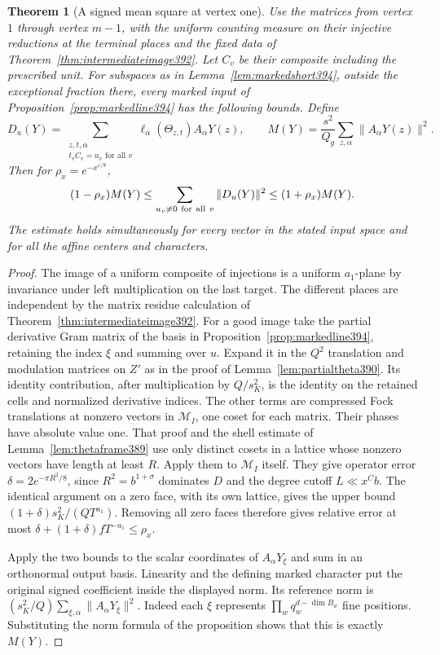 \documentclass[a4paper,11pt]{article}
\newtheorem{theorem}[proposition]{Theorem}
\theoremstyle{definition}
\theoremstyle{remark}
\numberwithin{equation}{section}
\begin{document}
\begin{theorem}[A signed mean square at vertex one]
\label{thm:firstvertex394}
Use the matrices from vertex \(1\) through vertex \(m-1\),
with the uniform counting measure on their injective reductions
at the terminal places and the fixed data of
Theorem~\ref{thm:intermediateimage392}. Let \(C_v\) be their
composite including the prescribed unit. For subspaces as in
Lemma~\ref{lem:markedshort394}, outside the exceptional fraction
there, every marked input of Proposition~\ref{prop:markedline394}
has the following bounds. Define
\[
 D_u(Y)=\sum_{\substack{z,t,\alpha\\ t_v C_v=u_v\text{ for all }v}}
              \ell_\alpha(\Theta_{z,t})A_\alpha Y(z),\qquad
 M(Y)=\frac{s^2}{Q_g}\sum_{z,\alpha}\|A_\alpha Y(z)\|^2 .
\]
Then for \(\rho_x=e^{-x^{\varepsilon/8}}\),
\[
 (1-\rho_x)M(Y)\le \sum_{u_v\ne0\ {\rm for\ all}\ v}
              \|D_u(Y)\|^2\le(1+\rho_x)M(Y).
\]
The estimate holds simultaneously for every vector in the
stated input space and for all the affine centers and characters.
\end{theorem}
\begin{proof}
The image of a uniform composite of injections is a uniform
\(a_1\)-plane by invariance under left multiplication on the
last target. The different places are independent by the
matrix residue calculation of Theorem~\ref{thm:intermediateimage392}.
For a good image take the partial derivative Gram matrix of the
basis in Proposition~\ref{prop:markedline394}, retaining the
index \(\xi\) and summing over \(u\). Expand it in the \(Q^2\)
translation and modulation matrices on \(Z'\) as in the proof of
Lemma~\ref{lem:partialtheta390}. Its identity contribution,
after multiplication by \(Q/s_K^2\), is the identity on the
retained cells and normalized derivative indices. The other
terms are compressed Fock translations at nonzero vectors in
\(\mathcal M_I\), one coset for each matrix. Their phases have
absolute value one. That proof and the shell estimate of
Lemma~\ref{lem:thetaframe389} use only distinct cosets in a
lattice whose nonzero vectors have length at least \(R\).
Apply them to \(\mathcal M_I\) itself. They give operator
error \(\delta=2e^{-\pi R^2/8}\), since \(R^2=b^{1+\sigma}\)
dominates \(D\) and the degree cutoff \(L\ll x^C b\).
The identical argument on a zero face, with its own lattice,
gives the upper bound \((1+\delta)s_K^2/(QT^{a_1})\).
Removing all zero faces therefore gives relative error at most
\(\delta+(1+\delta)fT^{-a_1}\le\rho_x\).

Apply the two bounds to the scalar coordinates of
\(A_\alpha Y_\xi\) and sum in an orthonormal output basis.
Linearity and the defining marked character put the original
signed coefficient inside the displayed norm. Its reference
norm is \((s_K^2/Q)\sum_{\xi,\alpha}\|A_\alpha Y_\xi\|^2\).
Indeed each \(\xi\) represents \(\prod_wq_w^{d-\dim B_w}\)
fine positions. Substituting the norm formula of the proposition
shows that this is exactly \(M(Y)\).
\end{proof}
\end{document}
